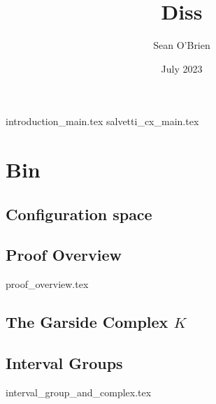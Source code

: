 \documentclass[12pt]{article}
\title{Diss}
\author{Sean O'Brien}
\date{July 2023}
\begin{document}
\maketitle
{introduction_main.tex}
{salvetti_cx_main.tex}


\section{Bin}
\subsection{Configuration space}
\subsection{Proof Overview}
{proof_overview.tex}
\subsection{The Garside Complex $K$}
\subsection{Interval Groups}
{interval_group_and_complex.tex}

\printbibliography
\end{document}
